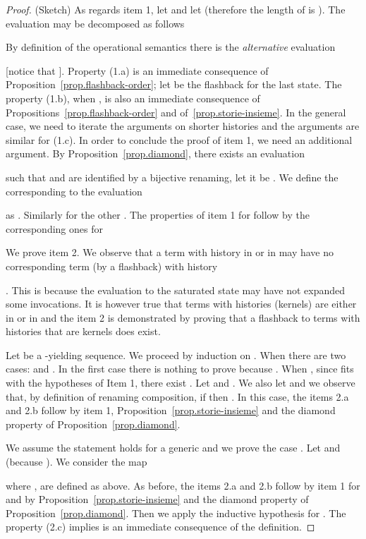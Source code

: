 \begin{proof} (Sketch)
As regards item 1, let   and let  (therefore the length of  is ).
The evaluation  may be decomposed as follows
 
By definition of the operational semantics there is the \emph{alternative} evaluation
 
[notice that ].
Property (1.a) is an immediate consequence of Proposition~\ref{prop.flashback-order};
let  be the flashback 
for the last state. The property (1.b), when , is also an immediate consequence of 
Propositions~\ref{prop.flashback-order}
and of~\ref{prop.storie-insieme}. In the general case, we need to iterate 
the arguments on shorter histories and the arguments are similar for (1.c).
In order to conclude the proof of item 1, we need an additional argument. By Proposition~\ref{prop.diamond}, there exists an evaluation

such that  and  are identified by a bijective renaming, let it be . We define
the 
corresponding to the evaluation

as . Similarly for the other
. The properties of item 1 for 
 follow
by the corresponding ones for


We prove item 2. We observe that a term with history
  in  or in  may have no
corresponding term (by a flashback) with history
  
. This is because the evaluation to the saturated state
may have not expanded some invocations. It is however true that terms with 
histories  (kernels) are either in  or in 
 and the item 2 is demonstrated by proving that a flashback to terms
with histories that are kernels does exist. 

Let  be a -yielding sequence. We proceed by induction on .
When  there are two cases:  and . In the first
case there is nothing to prove because . When ,
since  fits with the hypotheses of Item 1, there exist
.  
Let  and 
.
We also let  and we observe that, by definition of renaming composition, 
if  then
. 
In this case, the items 2.a and 2.b follow by item 1, 
Proposition~\ref{prop.storie-insieme} and the diamond property of Proposition~\ref{prop.diamond}.  


We assume the statement holds for a generic  and we prove the case .
Let  and  (because
). We consider the map

where , 
are defined as above.
As before, the items 2.a and 2.b follow by item 1 for 
  and by
Proposition~\ref{prop.storie-insieme} and the diamond property of Proposition~\ref{prop.diamond}.  Then we apply the inductive hypothesis for .
The property (2.c)  implies
  is an immediate consequence of the definition.
\end{proof}


